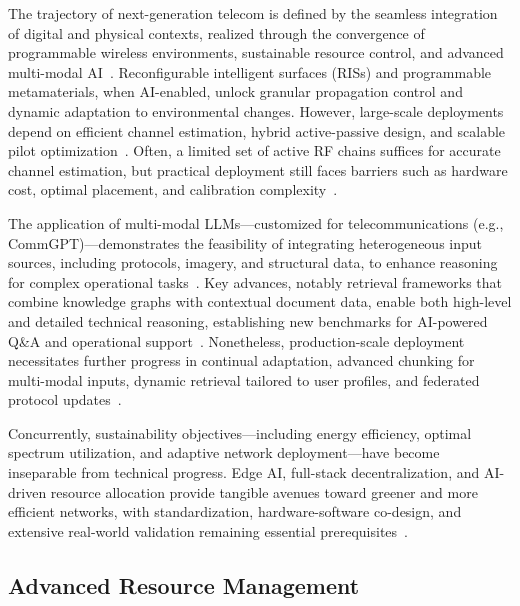 \documentclass[sigconf]{acmart}
\begin{document}
The trajectory of next-generation telecom is defined by the seamless integration of digital and physical contexts, realized through the convergence of programmable wireless environments, sustainable resource control, and advanced multi-modal AI~\cite{ref7,ref10,ref17,ref18,ref19,ref20,ref21,ref22,ref23,ref24,ref25,ref26,ref27,ref28,ref29,ref30,ref35,ref39,ref40}. Reconfigurable intelligent surfaces (RISs) and programmable metamaterials, when AI-enabled, unlock granular propagation control and dynamic adaptation to environmental changes. However, large-scale deployments depend on efficient channel estimation, hybrid active-passive design, and scalable pilot optimization~\cite{ref27,ref29,ref30,ref39,ref40}. Often, a limited set of active RF chains suffices for accurate channel estimation, but practical deployment still faces barriers such as hardware cost, optimal placement, and calibration complexity~\cite{ref27,ref29,ref30}.

The application of multi-modal LLMs---customized for telecommunications (e.g., CommGPT)---demonstrates the feasibility of integrating heterogeneous input sources, including protocols, imagery, and structural data, to enhance reasoning for complex operational tasks~\cite{ref26,ref35}. Key advances, notably retrieval frameworks that combine knowledge graphs with contextual document data, enable both high-level and detailed technical reasoning, establishing new benchmarks for AI-powered Q\&A and operational support~\cite{ref26,ref35}. Nonetheless, production-scale deployment necessitates further progress in continual adaptation, advanced chunking for multi-modal inputs, dynamic retrieval tailored to user profiles, and federated protocol updates~\cite{ref26,ref35}.

Concurrently, sustainability objectives---including energy efficiency, optimal spectrum utilization, and adaptive network deployment---have become inseparable from technical progress. Edge AI, full-stack decentralization, and AI-driven resource allocation provide tangible avenues toward greener and more efficient networks, with standardization, hardware-software co-design, and extensive real-world validation remaining essential prerequisites~\cite{ref17,ref18,ref26,ref28,ref29,ref30,ref35,ref39,ref40}.

\subsection{Advanced Resource Management}
\end{document}
